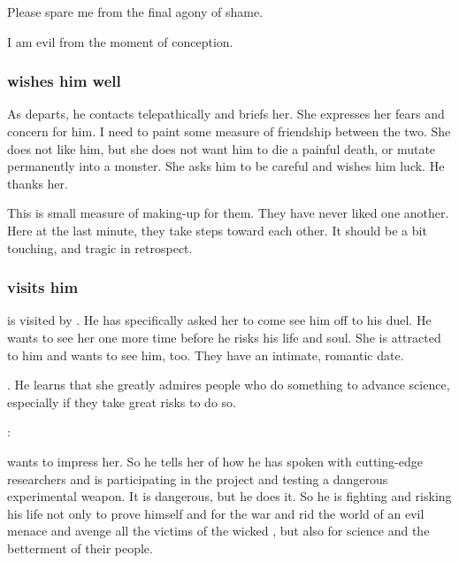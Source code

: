 \begin{garbage}
{  Please spare me from the final agony of shame.
  
  I am evil from the moment of conception.
}





\subsubsection{\Achsah{} wishes him well}
As \Teshrial{} departs, he contacts \Achsah{} telepathically and briefs her. 
She expresses her fears and concern for him. 
I need to paint some measure of friendship between the two. 
She does not like him, but she does not want him to die a painful death, or mutate permanently into a monster. 
She asks him to be careful and wishes him luck. 
He thanks her. 

This is small measure of making-up for them. 
They have never liked one another.
Here at the last minute, they take steps toward each other. 
It should be a bit touching, and tragic in retrospect. 





\subsubsection{\Firaxel{} visits him}
\Teshrial{} is visited by \Firaxel. 
He has specifically asked her to come see him off to his duel. 
He wants to see her one more time before he risks his life and soul. 
She is attracted to him and wants to see him, too. 
They have an intimate, romantic date. 

. 
He learns that she greatly admires people who do something to advance science, especially if they take great risks to do so. 

\begin{prose}
  \Firaxel: 
\end{prose}

\Teshrial{} wants to impress her. 
So he tells her of how he has spoken with cutting-edge researchers and is participating in the \neoresphan{} project and testing a dangerous experimental weapon. 
It is dangerous, but he does it. 
So he is fighting and risking his life not only to prove himself and for the war and rid the world of an evil menace and avenge all the victims of the wicked \Ishnaruchaefir, but also for science and the betterment of their people. 


\end{garbage}
